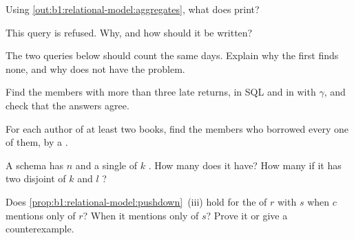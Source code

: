 \begin{exercise}[$\star$]\label{exo:b1:relational-model:4}
Using \cref{out:b1:relational-model:aggregates}, what does  print?
\end{exercise}

\begin{exercise}[$\star\star$]\label{exo:b1:relational-model:5}
This query is refused. Why, and how should it be written?
\end{exercise}

\begin{exercise}[$\star\star$]\label{exo:b1:relational-model:6}
The two queries below should count the same days. Explain why the first finds none, and why  does not
have the problem.
\end{exercise}

\begin{exercise}[$\star\star$]\label{exo:b1:relational-model:7}
Find the members with more than three late returns, in SQL and in  with $\gamma$, and check that the
answers agree.
\end{exercise}

\begin{exercise}[$\star\star$]\label{exo:b1:relational-model:8}
For each author of at least two books, find the members who borrowed every one of them, by a .
\end{exercise}

\begin{exercise}[$\star\star$]\label{exo:b1:relational-model:9}
A schema has $n$  and a single  of $k$ . How many  does it have? How many if it
has two disjoint  of $k$ and $l$ ?
\end{exercise}

\begin{exercise}[$\star\star\star$]\label{exo:b1:relational-model:10}
Does \cref{prop:b1:relational-model:pushdown}~(iii) hold for the  of $r$ with $s$ when $c$ mentions only
 of $r$? When it mentions only  of $s$? Prove it or give a counterexample.
\end{exercise}

